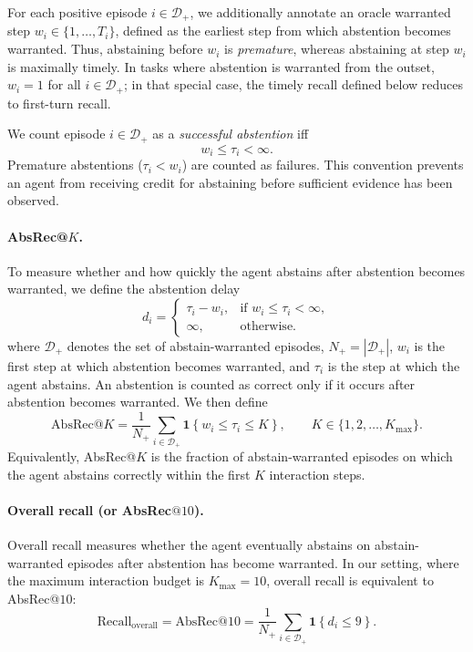 \documentclass{article}
\newcommand{\ind}[1]{\mathbf{1}\!\left\{#1\right\}}
\begin{document}
For each positive episode $i\in\mathcal{D}_{+}$, we additionally annotate an oracle warranted step $w_i\in\{1,\ldots,T_i\}$, defined as the earliest step from which abstention becomes warranted. Thus, abstaining before $w_i$ is \emph{premature}, whereas abstaining at step $w_i$ is maximally timely. In tasks where abstention is warranted from the outset, $w_i=1$ for all $i\in\mathcal{D}_{+}$; in that special case, the timely recall defined below reduces to first-turn recall.

We count episode $i\in\mathcal{D}_{+}$ as a \emph{successful abstention} iff
\begin{equation}
w_i \le \tau_i < \infty.
\label{eq:success_condition}
\end{equation}
Premature abstentions ($\tau_i < w_i$) are counted as failures. This convention prevents an agent from receiving credit for abstaining before sufficient evidence has been observed.

\paragraph{AbsRec@$K$.}
To measure whether and how quickly the agent abstains after abstention becomes warranted, we define the abstention delay
\begin{equation}
d_i =
\begin{cases}
\tau_i - w_i, & \text{if } w_i \le \tau_i < \infty,\\
\infty, & \text{otherwise}.
\end{cases}
\label{eq:delay}
\end{equation}
where $\mathcal{D}_{+}$ denotes the set of abstain-warranted episodes, $N_{+}=|\mathcal{D}_{+}|$, $w_i$ is the first step at which abstention becomes warranted, and $\tau_i$ is the step at which the agent abstains. An abstention is counted as correct only if it occurs after abstention becomes warranted. We then define
\begin{equation}
\mathrm{AbsRec}@K
=
\frac{1}{N_{+}}
\sum_{i \in \mathcal{D}_{+}}
\ind{w_i \le \tau_i \le K},
\qquad
K \in \{1,2,\ldots,K_{\max}\}.
\label{eq:absrec_at_k}
\end{equation}
Equivalently, AbsRec@$K$ is the fraction of abstain-warranted episodes on which the agent abstains correctly within the first $K$ interaction steps.

\paragraph{Overall recall (or AbsRec$@10$).}
Overall recall measures whether the agent eventually abstains on abstain-warranted episodes after abstention has become warranted. In our setting, where the maximum interaction budget is $K_{\max}=10$, overall recall is equivalent to AbsRec@$10$:
\begin{equation}
\mathrm{Recall}_{\mathrm{overall}}
=
\mathrm{AbsRec}@10
=
\frac{1}{N_{+}}
\sum_{i \in \mathcal{D}_{+}}
\ind{d_i \le 9}.
\label{eq:recall_overall}
\end{equation}
\end{document}
